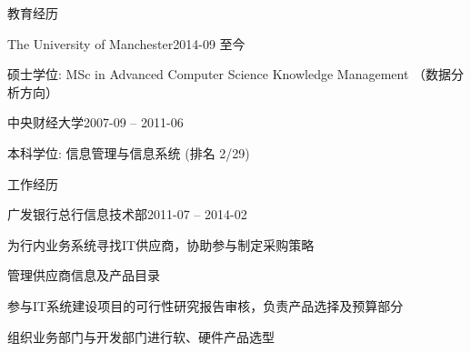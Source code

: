 \documentclass{resume} %
\begin{document}

\begin{rSection}{教育经历}

\begin{rSubsection}{The University of Manchester}{2014-09 至今}{}{}
    \item 硕士学位: MSc in Advanced Computer Science Knowledge Management （数据分析方向）
\end{rSubsection}

\begin{rSubsection}{中央财经大学}{2007-09 -- 2011-06}{}{}
    \item 本科学位: 信息管理与信息系统 (排名 2/29)
\end{rSubsection}

\end{rSection}


\begin{rSection}{工作经历}

\begin{rSubsection}{广发银行总行信息技术部}{2011-07 -- 2014-02}{}{}
\item 为行内业务系统寻找IT供应商，协助参与制定采购策略
\item 管理供应商信息及产品目录
\item 参与IT系统建设项目的可行性研究报告审核，负责产品选择及预算部分
\item 组织业务部门与开发部门进行软、硬件产品选型
\end{rSubsection}

\end{rSection}
\end{document}
